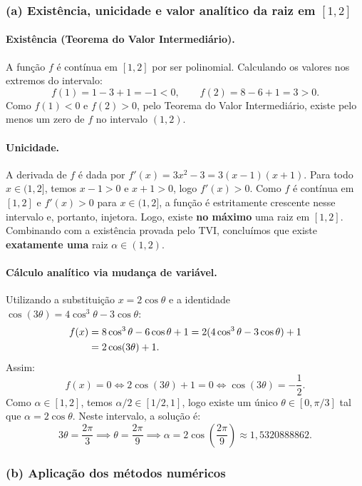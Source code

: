 \documentclass[12pt, a4paper]{article}
\begin{document}
\subsubsection*{(a) Existência, unicidade e valor analítico da raiz em $[1, 2]$}

\paragraph{Existência (Teorema do Valor Intermediário).}
A função $f$ é contínua em $[1, 2]$ por ser polinomial. Calculando os valores nos extremos do intervalo:
\[
    f(1) = 1 - 3 + 1 = -1 < 0, \qquad f(2) = 8 - 6 + 1 = 3 > 0.
\]
Como $f(1) < 0$ e $f(2) > 0$, pelo Teorema do Valor Intermediário, existe pelo menos um zero de $f$ no intervalo $(1, 2)$.

\paragraph{Unicidade.}
A derivada de $f$ é dada por $f'(x) = 3x^2 - 3 = 3(x-1)(x+1)$.
Para todo $x \in (1, 2]$, temos $x - 1 > 0$ e $x + 1 > 0$, logo $f'(x) > 0$.
Como $f$ é contínua em $[1, 2]$ e $f'(x) > 0$ para $x \in (1, 2]$, a função é estritamente crescente nesse intervalo e, portanto, injetora. Logo, existe \textbf{no máximo} uma raiz em $[1, 2]$. Combinando com a existência provada pelo TVI, concluímos que existe \textbf{exatamente uma} raiz $\alpha \in (1, 2)$.

\paragraph{Cálculo analítico via mudança de variável.}
Utilizando a substituição $x = 2\cos\theta$ e a identidade $\cos(3\theta) = 4\cos^3\theta - 3\cos\theta$:
\begin{align}
    f(x) &= 8\cos^3\theta - 6\cos\theta + 1 = 2(4\cos^3\theta - 3\cos\theta) + 1 \notag \\
         &= 2\cos(3\theta) + 1.
\end{align}
Assim:
\[
    f(x) = 0 \iff 2\cos(3\theta) + 1 = 0 \iff \cos(3\theta) = -\frac{1}{2}.
\]
Como $\alpha \in [1, 2]$, temos $\alpha/2 \in [1/2, 1]$, logo existe um único $\theta \in [0, \pi/3]$ tal que $\alpha = 2\cos\theta$. Neste intervalo, a solução é:
\[
    3\theta = \frac{2\pi}{3} \implies \theta = \frac{2\pi}{9} \implies \boxed{\alpha = 2\cos\!\left(\frac{2\pi}{9}\right) \approx 1{,}5320888862}.
\]


\subsubsection*{(b) Aplicação dos métodos numéricos}
\end{document}
